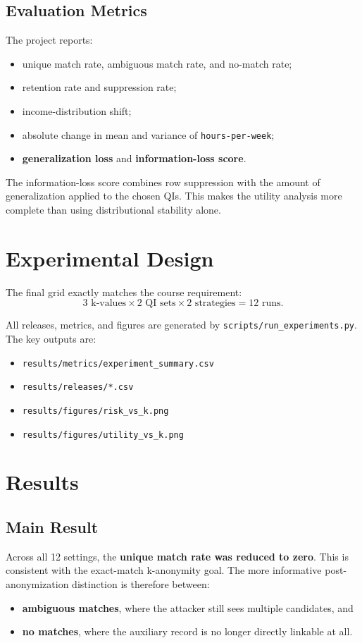 \documentclass[11pt]{article}
\begin{document}
\subsection{Evaluation Metrics}
The project reports:
\begin{itemize}[leftmargin=*]
    \item unique match rate, ambiguous match rate, and no-match rate;
    \item retention rate and suppression rate;
    \item income-distribution shift;
    \item absolute change in mean and variance of \texttt{hours-per-week};
    \item \textbf{generalization loss} and \textbf{information-loss score}.
\end{itemize}

The information-loss score combines row suppression with the amount of generalization applied to the chosen QIs. This makes the utility analysis more complete than using distributional stability alone.

\section{Experimental Design}
The final grid exactly matches the course requirement:
\[
3 \text{ k-values} \times 2 \text{ QI sets} \times 2 \text{ strategies} = 12 \text{ runs.}
\]

All releases, metrics, and figures are generated by \texttt{scripts/run\_experiments.py}. The key outputs are:
\begin{itemize}[leftmargin=*]
    \item \texttt{results/metrics/experiment\_summary.csv}
    \item \texttt{results/releases/*.csv}
    \item \texttt{results/figures/risk\_vs\_k.png}
    \item \texttt{results/figures/utility\_vs\_k.png}
\end{itemize}

\section{Results}
\subsection{Main Result}
Across all 12 settings, the \textbf{unique match rate was reduced to zero}. This is consistent with the exact-match k-anonymity goal. The more informative post-anonymization distinction is therefore between:
\begin{itemize}[leftmargin=*]
    \item \textbf{ambiguous matches}, where the attacker still sees multiple candidates, and
    \item \textbf{no matches}, where the auxiliary record is no longer directly linkable at all.
\end{itemize}
\end{document}
